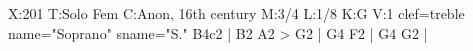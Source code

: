 X:201
T:Solo Fem
C:Anon, 16th century
M:3/4
L:1/8
K:G
V:1 clef=treble name="Soprano" sname="S."
B4c2 | B2 A2 > G2 | G4 F2 | G4 G2 |
